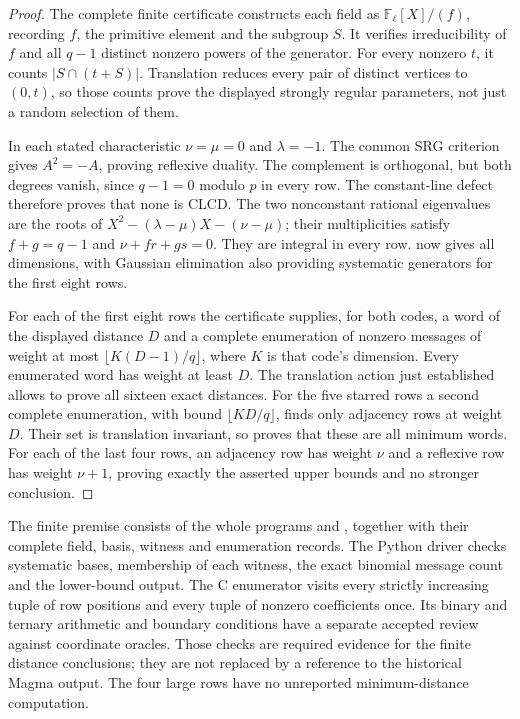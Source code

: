 \begin{proof}
The complete finite certificate constructs each field as
$\mathbb F_\ell[X]/(f)$, recording $f$, the primitive element and the
subgroup $S$. It verifies irreducibility of $f$ and all $q-1$ distinct
nonzero powers of the generator. For every nonzero $t$, it counts
$|S\cap(t+S)|$. Translation reduces every pair of distinct vertices
to $(0,t)$, so those counts prove the displayed strongly regular
parameters, not just a random selection of them.

In each stated characteristic $\nu=\mu=0$ and $\lambda=-1$.
The common SRG criterion gives $A^2=-A$, proving reflexive duality.
The complement is orthogonal, but both degrees vanish, since
$q-1=0$ modulo $p$ in every row. The constant-line defect therefore
proves that none is CLCD. The two nonconstant rational eigenvalues are
the roots of $X^2-(\lambda-\mu)X-(\nu-\mu)$; their multiplicities
satisfy $f+g=q-1$ and $\nu+fr+gs=0$. They are integral in every row.
 now gives all dimensions, with Gaussian elimination
also providing systematic generators for the first eight rows.

For each of the first eight rows the certificate supplies, for both
codes, a word of the displayed distance $D$ and a complete enumeration
of nonzero messages of weight at most
$\lfloor K(D-1)/q\rfloor$, where $K$ is that code's dimension.
Every enumerated word has weight at least $D$.
The translation action just established allows
 to prove all sixteen exact distances.
For the five starred rows a second complete enumeration, with bound
$\lfloor KD/q\rfloor$, finds only adjacency rows at weight $D$.
Their set is translation invariant, so
 proves that these are all minimum words.
For each of the last four rows, an adjacency row has weight $\nu$ and
a reflexive row has weight $\nu+1$, proving exactly the asserted upper
bounds and no stronger conclusion.
\end{proof}

The finite premise consists of the whole programs
 and
, together with their complete
field, basis, witness and enumeration records. The Python driver checks
systematic bases, membership of each witness, the exact binomial message
count and the lower-bound output. The C enumerator visits every
strictly increasing tuple of row positions and every tuple of nonzero
coefficients once. Its binary and ternary arithmetic and boundary
conditions have a separate accepted review against coordinate oracles.
Those checks are required evidence for the finite distance conclusions;
they are not replaced by a reference to the historical Magma output.
The four large rows have no unreported minimum-distance computation.

